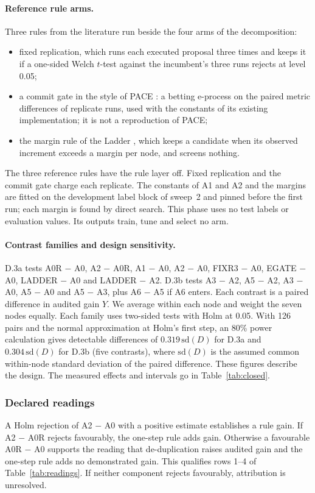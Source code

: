 \paragraph{Reference rule arms.}
Three rules from the literature run beside the four arms of the decomposition:
\begin{itemize}
\item fixed replication, which runs each executed proposal three times and keeps it if a one-sided Welch $t$-test against the incumbent's three runs rejects at level 0.05;
\item a commit gate in the style of PACE \citep{shawn2026pace}: a betting e-process on the paired metric differences of replicate runs, used with the constants of its existing implementation; it is not a reproduction of PACE;
\item the margin rule of the Ladder \citep{blum2015ladder}, which keeps a candidate when its observed increment exceeds a margin per node, and screens nothing.
\end{itemize}
The three reference rules have the rule layer off. Fixed replication and the commit gate charge each replicate. The constants of A1 and A2 and the margins are fitted on the development label block of sweep~2 and pinned before the first run; each margin is found by direct search. This phase uses no test labels or evaluation values. Its outputs train, tune and select no arm.

\paragraph{Contrast families and design sensitivity.}
D.3a tests A0R $-$ A0, A2 $-$ A0R, A1 $-$ A0, A2 $-$ A0, FIXR3 $-$ A0, EGATE $-$ A0, LADDER $-$ A0 and LADDER $-$ A2. D.3b tests A3 $-$ A2, A5 $-$ A2, A3 $-$ A0, A5 $-$ A0 and A5 $-$ A3, plus A6 $-$ A5 if A6 enters. Each contrast is a paired difference in audited gain $Y$. We average within each node and weight the seven nodes equally. Each family uses two-sided tests with Holm at 0.05. With 126 pairs and the normal approximation at Holm's first step, an 80\% power calculation gives detectable differences of $0.319\,\mathrm{sd}(D)$ for D.3a and $0.304\,\mathrm{sd}(D)$ for D.3b (five contrasts), where $\mathrm{sd}(D)$ is the assumed common within-node standard deviation of the paired difference. These figures describe the design. The measured effects and intervals go in Table~\ref{tab:closed}.

\subsubsection{Declared readings}
\label{app:d3-readings}
A Holm rejection of A2 $-$ A0 with a positive estimate establishes a rule gain. If A2 $-$ A0R rejects favourably, the one-step rule adds gain. Otherwise a favourable A0R $-$ A0 supports the reading that de-duplication raises audited gain and the one-step rule adds no demonstrated gain. This qualifies rows 1--4 of Table~\ref{tab:readings}. If neither component rejects favourably, attribution is unresolved.

